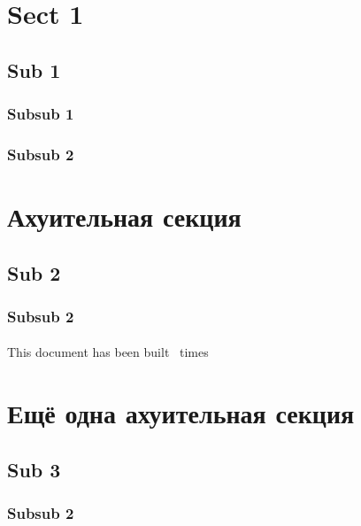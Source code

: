 \documentclass[a4paper,twoside]{article}
\begin{document}
\section{Sect 1}
\emph{\lipsum[4]}
\subsection{Sub 1}
\subsubsection{Subsub 1}
\paragraph{}
\lipsum[1]
\subsubsection{Subsub 2}
\paragraph{}
\lipsum[5]


\section{Ахуительная секция }
\subsection{Sub 2}
\subsubsection{Subsub 2}
\paragraph{}
\lipsum[2-3]

This document has been built \zruns\ times
\pagebreak

\section{Ещё одна ахуительная секция}
\subsection{Sub 3}
\subsubsection{Subsub 2}
\paragraph{}
\lipsum[1-9]
\end{document}
